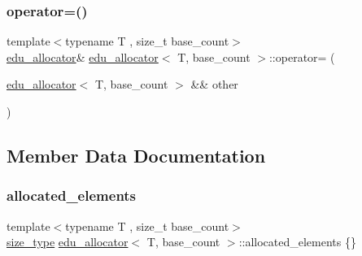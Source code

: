 \mbox{\label{classedu__allocator_af56502a382e898432e5c0a1e42e61e96}} 
\subsubsection{\texorpdfstring{operator=()}{operator=()}\hspace{0.1cm}{\footnotesize\ttfamily [2/2]}}
{\footnotesize\ttfamily template$<$typename T , size\+\_\+t base\+\_\+count$>$ \\
\hyperlink{classedu__allocator}{edu\+\_\+allocator}\& \hyperlink{classedu__allocator}{edu\+\_\+allocator}$<$ T, base\+\_\+count $>$\+::operator= (\begin{DoxyParamCaption}\item[{\hyperlink{classedu__allocator}{edu\+\_\+allocator}$<$ T, base\+\_\+count $>$ \&\&}]{other }\end{DoxyParamCaption})\hspace{0.3cm}{\ttfamily [delete]}}



\subsection{Member Data Documentation}
\mbox{\label{classedu__allocator_ae6cb130b199afb8e9c2a555508ff88d6}} 
\subsubsection{\texorpdfstring{allocated\+\_\+elements}{allocated\_elements}}
{\footnotesize\ttfamily template$<$typename T , size\+\_\+t base\+\_\+count$>$ \\
\hyperlink{classedu__allocator_aa140c3e2a9364dcbc207fa148b5c1deb}{size\+\_\+type} \hyperlink{classedu__allocator}{edu\+\_\+allocator}$<$ T, base\+\_\+count $>$\+::allocated\+\_\+elements \{\}}

\mbox{\label{classedu__allocator_ac589cfa71f123e6e4e78a0f648235a9a}} 

